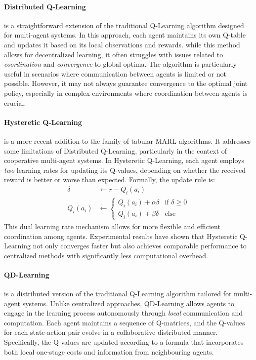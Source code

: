  \paragraph*{Distributed Q-Learning} is a straightforward extension of the traditional Q-Learning algorithm designed for multi-agent systems. 
In this approach, 
 each agent maintains its own Q-table and updates it based on its local observations and rewards.
 while this method allows for decentralized learning, 
it often struggles with issues related to \emph{coordination} and \emph{convergence} to global optima. The algorithm is particularly useful in scenarios where communication between agents is limited or not possible.
However, it may not always guarantee convergence to the optimal joint policy, 
especially in complex environments where coordination between agents is crucial.
 
 \paragraph*{Hysteretic Q-Learning~\cite{hysteretic-q}} is a more recent addition to the family of tabular MARL algorithms. 
  It addresses some limitations of Distributed Q-Learning, 
  particularly in the context of cooperative multi-agent systems. 
  In Hysteretic Q-Learning, each agent employs \emph{two} learning rates for updating its Q-values, 
  depending on whether the received reward is better or worse than expected. 
  Formally, the update rule is:
  \begin{align*}
    \delta & \leftarrow r - Q_i(a_i) \\
    Q_i(a_i) & \leftarrow 
    \begin{cases} 
    Q_i(a_i) + \alpha \delta & \text{if } \delta \geq 0 \\
    Q_i(a_i) + \beta \delta & \text{else}
    \end{cases}
  \end{align*}
  This dual learning rate mechanism allows for more flexible and efficient coordination among agents. 
  Experimental results have shown that Hysteretic Q-Learning not only converges faster but also achieves comparable performance to centralized methods with significantly less computational overhead.

 \paragraph*{QD-Learning~\cite{qdlearning}}
 is a distributed version of the traditional Q-Learning algorithm tailored for multi-agent systems. 
%
Unlike centralized approaches, 
 QD-Learning allows agents to engage in the learning process autonomously through \emph{local} communication and computation.
% 
Each agent maintains a sequence of Q-matrices, 
  and the Q-values for each state-action pair evolve in a collaborative distributed manner. 
%
Specifically, the Q-values are updated according to a formula that incorporates both local one-stage costs 
  and information from neighbouring agents.

